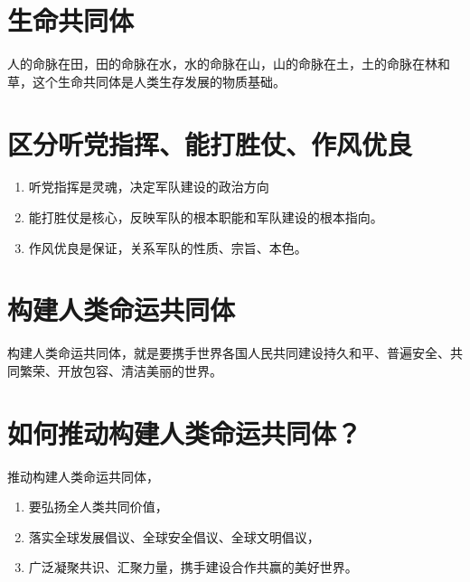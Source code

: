 \documentclass[12pt, a4paper, oneside]{ctexbook}
\begin{document}
\section{生命共同体}

人的命脉在田，田的命脉在水，水的命脉在山，山的命脉在土，土的命脉在林和草，这个生命共同体是人类生存发展的物质基础。

\section{区分听党指挥、能打胜仗、作风优良}
\begin{enumerate}
\item 听党指挥是灵魂，决定军队建设的政治方向

\item 能打胜仗是核心，反映军队的根本职能和军队建设的根本指向。

\item 作风优良是保证，关系军队的性质、宗旨、本色。

\end{enumerate}

\section{构建人类命运共同体}

构建人类命运共同体，就是要携手世界各国人民共同建设持久和平、普遍安全、共同繁荣、开放包容、清洁美丽的世界。

\section{如何推动构建人类命运共同体？}

推动构建人类命运共同体，
\begin{enumerate}
\item 要弘扬全人类共同价值，

\item 落实全球发展倡议、全球安全倡议、全球文明倡议，

\item 广泛凝聚共识、汇聚力量，携手建设合作共赢的美好世界。
\end{enumerate}
\end{document}
